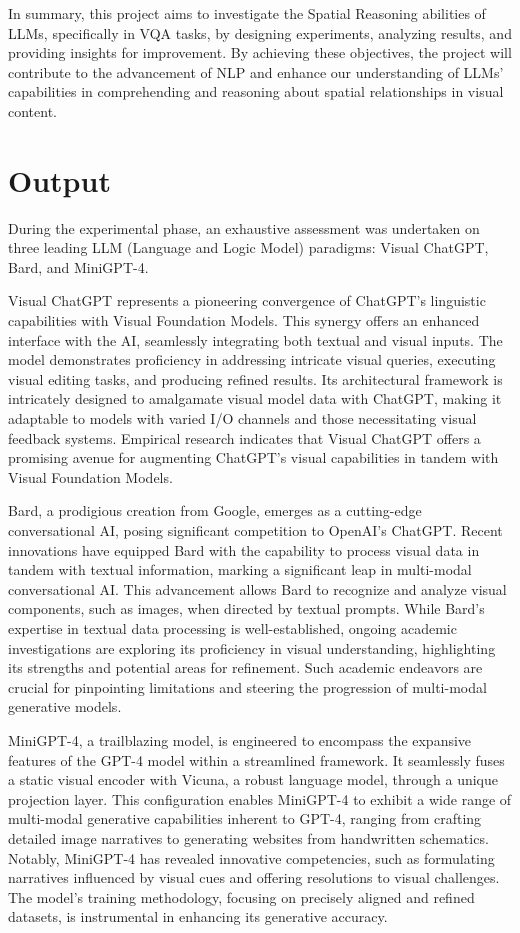 \documentclass[journal,10pt]{IEEEtran}
\begin{document}
In summary, this project aims to investigate the Spatial Reasoning abilities of LLMs, specifically in VQA tasks, by designing experiments, analyzing results, and providing insights for improvement. By achieving these objectives, the project will contribute to the advancement of NLP and enhance our understanding of LLMs' capabilities in comprehending and reasoning about spatial relationships in visual content.

\section{Output}
During the experimental phase, an exhaustive assessment was undertaken on three leading LLM (Language and Logic Model) paradigms: Visual ChatGPT\cite{wu2023visual}, Bard, and MiniGPT-4\cite{zhu2023minigpt4}.

Visual ChatGPT represents a pioneering convergence of ChatGPT's linguistic capabilities with Visual Foundation Models. This synergy offers an enhanced interface with the AI, seamlessly integrating both textual and visual inputs. The model demonstrates proficiency in addressing intricate visual queries, executing visual editing tasks, and producing refined results. Its architectural framework is intricately designed to amalgamate visual model data with ChatGPT, making it adaptable to models with varied I/O channels and those necessitating visual feedback systems. Empirical research indicates that Visual ChatGPT offers a promising avenue for augmenting ChatGPT's visual capabilities in tandem with Visual Foundation Models\cite{wu2023visual}.

Bard, a prodigious creation from Google, emerges as a cutting-edge conversational AI, posing significant competition to OpenAI's ChatGPT. Recent innovations have equipped Bard with the capability to process visual data in tandem with textual information, marking a significant leap in multi-modal conversational AI. This advancement allows Bard to recognize and analyze visual components, such as images, when directed by textual prompts. While Bard's expertise in textual data processing is well-established, ongoing academic investigations are exploring its proficiency in visual understanding, highlighting its strengths and potential areas for refinement. Such academic endeavors are crucial for pinpointing limitations and steering the progression of multi-modal generative models\cite{qin2023good}.

MiniGPT-4, a trailblazing model, is engineered to encompass the expansive features of the GPT-4 model within a streamlined framework. It seamlessly fuses a static visual encoder with Vicuna, a robust language model, through a unique projection layer. This configuration enables MiniGPT-4 to exhibit a wide range of multi-modal generative capabilities inherent to GPT-4, ranging from crafting detailed image narratives to generating websites from handwritten schematics. Notably, MiniGPT-4 has revealed innovative competencies, such as formulating narratives influenced by visual cues and offering resolutions to visual challenges. The model's training methodology, focusing on precisely aligned and refined datasets, is instrumental in enhancing its generative accuracy\cite{zhu2023minigpt4}.
\end{document}
